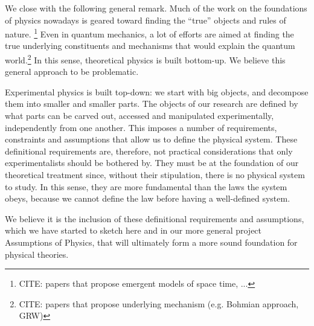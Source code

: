 \documentclass[10pt,twocolumn, nofootinbib]{revtex4-2}
\begin{document}
We close with the following general remark. Much of the work on the foundations of physics nowadays is geared toward finding the ``true'' objects and rules of nature.\cite{huggett2013emergent,oriti2009approaches,lee2020model} \footnote{CITE: papers that propose emergent models of space time, ...} Even in quantum mechanics, a lot of efforts are aimed at finding the true underlying constituents and mechanisms that would explain the quantum world.\cite{larsson2014loopholes, ghirardi1986unified, carroll2019something, nikolic2007bohmian}\footnote{CITE: papers that propose underlying mechanism (e.g. Bohmian approach, GRW)} In this sense, theoretical physics is built bottom-up. We believe this general approach to be problematic.

Experimental physics is built top-down: we start with big objects, and decompose them into smaller and smaller parts. The objects of our research are defined by what parts can be carved out, accessed and manipulated experimentally, independently from one another. This imposes a number of requirements, constraints and assumptions that allow us to define the physical system. These definitional requirements are, therefore, not practical considerations that only experimentalists should be bothered by. They must be at the foundation of our theoretical treatment since, without their stipulation, there is no physical system to study. In this sense, they are more fundamental than the laws the system obeys, because we cannot define the law before having a well-defined system.

We believe it is the inclusion of these definitional requirements and assumptions, which we have started to sketch here and in our more general project Assumptions of Physics, that will ultimately form a more sound foundation for physical theories.




\end{document}
